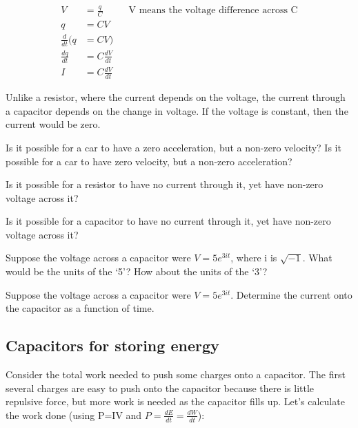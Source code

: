 \begin{align*}
V &= \frac{q}{C}&&\text{V means the voltage difference across C}\\
q &= CV\\
\frac{d}{dt}(q &= CV)\\
\frac{dq}{dt}&=C\frac{dV}{dt}\\
I &= C\frac{dV}{dt}
\end{align*}

Unlike a resistor, where the current depends on the voltage, the current through a capacitor depends on the change in voltage. If the voltage is constant, then the current would be zero.\par

\begin{alevel}
Is it possible for a car to have a zero acceleration, but a non-zero velocity? Is it possible for a car to have zero velocity, but a non-zero acceleration?
\end{alevel}

\begin{alevel}
Is it possible for a resistor to have no current through it, yet have non-zero voltage across it?
\end{alevel}

\begin{alevel}
Is it possible for a capacitor to have no current through it, yet have non-zero voltage across it?
\end{alevel}

\begin{clevel}
Suppose the voltage across a capacitor were $V = 5e^{3it}$, where i is $\sqrt{-1}$. What would be the units of the `5'? How about the units of the `3'?
\end{clevel}

\begin{clevel}
Suppose the voltage across a capacitor were $V = 5e^{3it}$. Determine the current onto the capacitor as a function of time.
\end{clevel}

\subsection{Capacitors for storing energy}
Consider the total work needed to push some charges onto a capacitor. The first several charges are easy to push onto the capacitor because there is little repulsive force, but more work is needed as the capacitor fills up. Let's calculate the work done (using P=IV and $P=\frac{dE}{dt} = \frac{dW}{dt}$):

